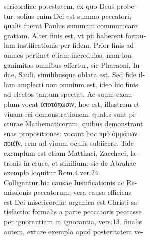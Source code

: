 \documentclass{article}
\begin{document}
\begin{pages}
                sericordiae potestatem, ex quo Deus probe- \\
                tur: solius enim Dei est summo peccatori, \\
                qualis fuerat Paulus summam communicare \\
                gratiam. Alter finis est, vt pii haberent formu- \\
                lam iustificationis per fidem. Prior finis ad \\
                omnes pertinet etiam incredulos: nam lon- \\
                ganimitas omnibus offertur, sic Pharaoni, Iu- \\
                dae, Sauli, similibusque oblata est. Sed fide il- \\
                lam amplecti non omnium est, ideo hic finis \\
                ad electos tantum spectat. Ac suum exem- \\
                plum vocat ὐποτόπωσιν, hoc est, illustrem et \\
                viuam rei demonstrationem, quales sunt pi- \\
                cturae Mathematicorum, quibus demonstrant \\
                suas propositiones: vocant hoc πρὸ ὀμμάτων \\
                ποιέῖν, rem ad viuum oculis subiicere. Tale \\
                exemplum est etiam Matthaei, Zacchaei, la- \\
                tronis in cruce, et similium: sic de Abrahae \\
                exemplo loquitur Rom.4.ver.24. \\
                Colligantur hic causae Iustificationis ac Re- \\
                missionis peccatorum: vera causa efficiens \\
                est Dei misericordia: organica est Christi sa- \\
                tisfactio: formalis a parte peccatoris peccasse \\
                per ignorantiam in ignorantia, vers.13. finalis \\
                autem, extare exempla apud posteritatem ve- \\

\end{pages}
\end{document}
